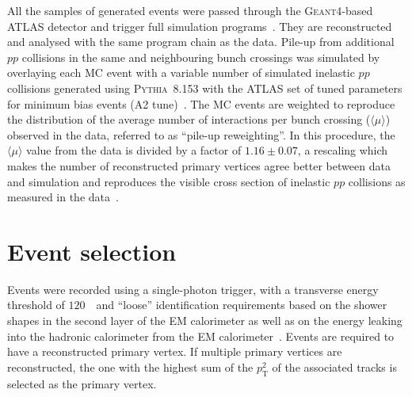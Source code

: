 \documentclass[cernpreprint,texlive=2016,txfonts,UKenglish]{latex/atlasdoc}
\def\pt{p_{\mathrm{T}}}
\def\pyt{{\textsc{Pythia}}}
\begin{document}
All the samples of generated events were passed through the
{\textsc{Geant4}}-based~\cite{nim:a506:250} ATLAS detector and trigger
full simulation programs~\cite{epj:c70:823}. They are reconstructed
and analysed with the same program chain as the data. Pile-up from
additional $pp$ collisions  in the same and neighbouring bunch
crossings was simulated by overlaying each MC event with a variable
number of simulated inelastic $pp$ collisions generated using
\pyt~8.153 with the ATLAS set of tuned parameters for minimum bias
events (A2 tune)~\cite{ATL-PHYS-PUB-2012-003}. The MC events are
weighted to reproduce the distribution of the average number of
interactions per bunch crossing ($\langle\mu\rangle$) observed in the
data, referred to as ``pile-up reweighting''. In this procedure, the
$\langle\mu\rangle$ value from the data is divided by a factor of
$1.16\pm 0.07$, a rescaling which makes the number  of reconstructed
primary vertices agree better between data and simulation and
reproduces the visible cross section of inelastic $pp$ collisions as
measured in the data~\cite{nc:2:463}.

\section{Event selection}
\label{evesel}
Events were recorded using a single-photon trigger, with a transverse
energy threshold of $120$~\GeV\ and ``loose'' identification
requirements based on the shower shapes in the second layer of the EM
calorimeter as well as on  the energy leaking into the hadronic
calorimeter from the EM calorimeter~\cite{epj:c77:317}. Events are
required to have a reconstructed primary vertex. If multiple primary
vertices are reconstructed, the one with the highest sum of the
$\pt^2$ of the associated tracks is selected as the primary vertex.
\end{document}
